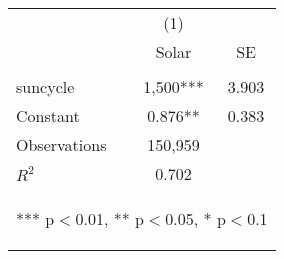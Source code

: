 \begin{center}
\begin{tabular}{lcc} 
 & (1) &  \\
\textcolor{white}{VARIABLES} & Solar & SE \\ \midrule
\vspace{4pt} & \begin{footnotesize}\end{footnotesize} & \begin{footnotesize}\end{footnotesize} \\
suncycle & 1,500*** & 3.903 \\
Constant & 0.876** & 0.383 \\
\midrule Observations & 150,959 &  \\
 $R^2$ & 0.702 &  \\ \bottomrule
\multicolumn{3}{c}{\begin{footnotesize} *** p$<$0.01, ** p$<$0.05, * p$<$0.1\end{footnotesize}} \\
\end{tabular}
\end{center}
